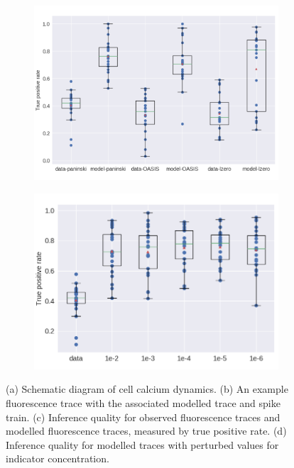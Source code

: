 \documentclass[a4paper,12pt]{article}
\theoremstyle{definition}
\begin{document}
\begin{figure}[t]
\begin{subfigure}[b]{0.45\textwidth}
    \includegraphics[width=\textwidth]{three_algo_comparison_tp.png}
    \caption{}
    \label{subfig:three_algo_comparison_tp}
  \end{subfigure}
  \begin{subfigure}[b]{0.45\textwidth}
    \includegraphics[width=\textwidth]{indicator_perturbed_paninski_true_positive.png}
    \caption{}
    \label{subfig:indicator_perturbed_paninski_true_positive}
  \end{subfigure}
  \caption{(a) Schematic diagram of cell calcium dynamics. (b) An example fluorescence trace with the associated modelled trace and spike train. (c) Inference quality for observed fluorescence traces and modelled fluorescence traces, measured by true positive rate. (d) Inference quality for modelled traces with perturbed values for indicator concentration.}
  \label{fig:crowded_figure}
\end{figure}
\end{document}
